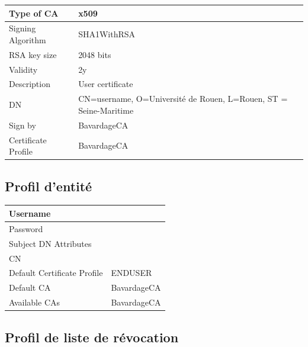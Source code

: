 \documentclass[a4paper,11pt,french]{book}
\begin{document}
\begin{tabular}{|l|p{10cm}|}
\hline
Type of CA  & x509
\\
\hline
Signing Algorithm  &  SHA1WithRSA
\\
\hline
RSA key size  & 2048 bits
\\
\hline
Validity & 2y
\\
\hline
Description  & User certificate
\\
\hline
DN &  CN=username, O=Université de Rouen, L=Rouen, ST = Seine-Maritime
\\
\hline
 Sign by  & BavardageCA
\\
\hline
Certificate Profile  & BavardageCA
\\
\hline
\end{tabular}





\subsection{Profil d'entité}

\begin{tabular}{|l|p{10cm}|}
\hline
Username  &
\\
\hline
Password  & 
\\
\hline
Subject DN Attributes  &  
\\
\hline
CN & 
\\
\hline
Default Certificate Profile  & ENDUSER
\\
\hline
Default CA  & BavardageCA
\\
\hline
Available CAs & BavardageCA
\\
\hline
\end{tabular}




\subsection{Profil de liste de révocation}
\end{document}

